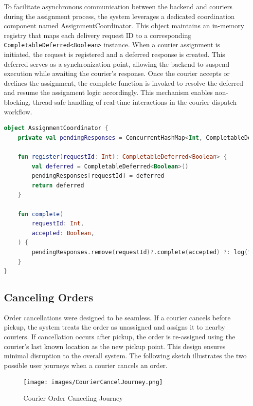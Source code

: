 To facilitate asynchronous communication between the backend and couriers during the assignment process, the system leverages a dedicated coordination component named AssignmentCoordinator. This object maintains an in-memory registry that maps each delivery request ID to a corresponding \texttt{CompletableDeferred<Boolean>} instance. When a courier assignment is initiated, the request is registered and a deferred response is created. This deferred serves as a synchronization point, allowing the backend to suspend execution while awaiting the courier’s response. Once the courier accepts or declines the assignment, the complete function is invoked to resolve the deferred and resume the assignment logic accordingly. This mechanism enables non-blocking, thread-safe handling of real-time interactions in the courier dispatch workflow.

\vspace{5.0mm}

\begin{lstlisting}[language=Kotlin, caption={Assignment Coordination}]
object AssignmentCoordinator {
    private val pendingResponses = ConcurrentHashMap<Int, CompletableDeferred<Boolean>>()

    fun register(requestId: Int): CompletableDeferred<Boolean> {
        val deferred = CompletableDeferred<Boolean>()
        pendingResponses[requestId] = deferred
        return deferred
    }

    fun complete(
        requestId: Int,
        accepted: Boolean,
    ) {
        pendingResponses.remove(requestId)?.complete(accepted) ?: log("Already completed or missing")
    }
}
\end{lstlisting}

\newpage

\subsection{Canceling Orders}

Order cancellations were designed to be seamless. If a courier cancels before pickup, the system treats the order as unassigned and assigns it to nearby couriers. If cancellation occurs after pickup, the order is re-assigned using the courier’s last known location as the new pickup point. This design ensures minimal disruption to the overall system.
The following sketch illustrates the two possible user journeys when a courier cancels an order.

\begin{figure}[H]
    \centering
    \texttt{[image: images/CourierCancelJourney.png]}
    \caption{Courier Order Canceling Journey}
\end{figure}

